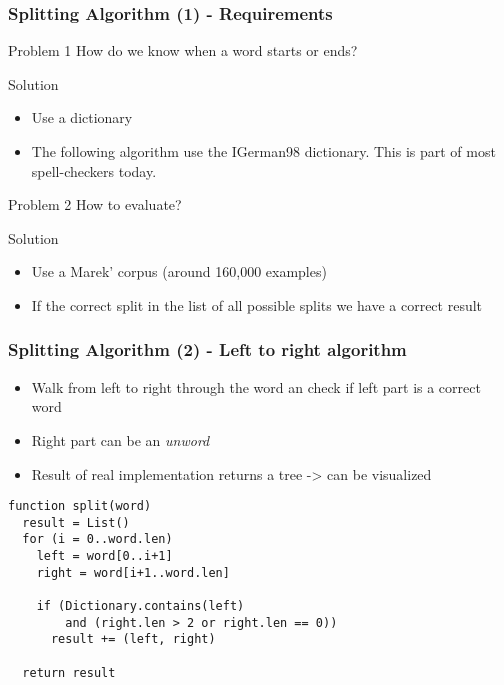 \documentclass[accentcolor=tud9b, colorbacktitle, inverttitle]{tudbeamer}
\begin{document}
\begin{frame}
  \frametitle{Splitting Algorithm (1) - Requirements}
  \begin{block}{Problem 1}
    How do we know when a word starts or ends?
  \end{block}
  \begin{block}{Solution}
    \begin{itemize}
      \item Use a dictionary
      \item The following algorithm use the IGerman98 dictionary. This is part of most spell-checkers today.
    \end{itemize}
  \end{block}

  \begin{block}{Problem 2}
    How to evaluate?
  \end{block}
  \begin{block}{Solution}
    \begin{itemize}
      \item Use a Marek' corpus \cite[Marek]{marek} (around 160,000 examples) 
      \item If the correct split in the list of all possible splits we have a correct result
    \end{itemize}
  \end{block}
\end{frame}

\begin{frame}[fragile]
  \frametitle{Splitting Algorithm (2) - Left to right algorithm}

\begin{itemize}
  \item Walk from left to right through the word an check if left part is a correct word
  \item Right part can be an \emph{unword}
  \item Result of real implementation returns a tree -> can be visualized
\end{itemize}

\begin{lstlisting}
function split(word)
  result = List()
  for (i = 0..word.len)
    left = word[0..i+1]
    right = word[i+1..word.len]

    if (Dictionary.contains(left)
        and (right.len > 2 or right.len == 0))
      result += (left, right)

  return result
\end{lstlisting}
\end{frame}
\end{document}
